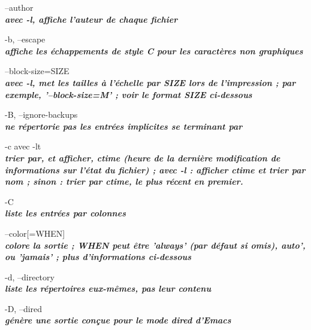 \documentclass{article}
\begin{document}
\par --author\\
              \textit{\textbf{avec -l, affiche l'auteur de chaque fichier}}\\

   \par-b, --escape\\
              \textit{\textbf{affiche les échappements de style C pour les caractères non graphiques}}\\

       \par--block-size=SIZE\\
             \textit{\textbf{ avec -l, met les tailles à l'échelle par SIZE lors de l'impression ; par exemple,
              '--block-size=M' ; voir le format SIZE ci-dessous}}\\

      \par -B, --ignore-backups\\
               \textit{\textbf{ne répertorie pas les entrées implicites se terminant par ~}}\\

      \par -c avec -lt \\
		  \textit{\textbf{trier par, et afficher, ctime (heure de la dernière modification de
              informations sur l'état du fichier) ; avec -l : afficher ctime et trier par nom ;
              sinon : trier par ctime, le plus récent en premier.}}\\

       \par-C \\
	 \textit{\textbf{liste les entrées par colonnes}}\\


       \par --color[=WHEN] \\
               \textit{\textbf{colore la sortie ; WHEN peut être 'always' (par défaut si omis),
              auto', ou 'jamais' ; plus d'informations ci-dessous}}\\

       \par-d, --directory\\
              \textit{\textbf{liste les répertoires eux-mêmes, pas leur contenu}}\\

      \par -D, --dired\\
              \textit{\textbf{génère une sortie conçue pour le mode dired d'Emacs}}\\
\end{document}
